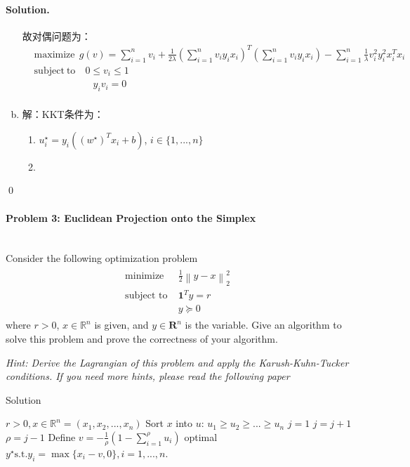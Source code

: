 \documentclass[a4paper]{article}
\newenvironment{solution}
{\color{blue} \paragraph{Solution.}}
{\newline \qed}
\begin{document}
\begin{solution}
\begin{enumerate}[a)]
                故对偶问题为：
                \begin{equation}
                    \begin{split}
                        &\text{maximize} \ \ g(v)=\sum_{i=1}^n v_i+\frac 1{2\lambda}(\sum_{i=1}^nv_iy_ix_i)^T(\sum_{i=1}^nv_iy_ix_i)-\sum_{i=1}^n \frac 1\lambda v_i^2y_i^2x_i^Tx_i\\
                        &\text{subject}\ \text{to}\quad 0\leq v_i\leq 1\\
                        &\quad \quad\quad\quad \quad\quad y_iv_i=0\\
                    \end{split}
                \end{equation}

        \item 解：KKT条件为：
            \begin{enumerate}[1)]
                \item $u^\star_i=y_i((w^\star)^Tx_i+b)$, $i\in\{1, ...,n\}$
                \item 
            \end{enumerate}
    \end{enumerate}
\end{solution}

\paragraph{Problem 3: Euclidean Projection onto the Simplex}
~\\
Consider the following optimization problem
\begin{gather*}
\begin{matrix}
\text{minimize~~} & \frac{1}{2}\left\|y-x\right\|^2_2\quad\\
\text{subject to} & \mathbf{1}^Ty=r\quad\quad\\
&y\succeq0\quad\quad\quad
\end{matrix}
\end{gather*}
where $r>0$, $x\in \mathbb{R}^n$ is given, and $y\in \mathbf{R}^n$ is the variable. Give an algorithm to solve this problem and prove the correctness of your algorithm.

\noindent\emph{Hint: Derive the Lagrangian of this problem and apply the Karush-Kuhn-Tucker conditions. If you need more hints, please read the following paper \cite{Wang2013}}


\begin{algorithm}
    \caption{Solution}
    \begin{algorithmic}[1]
        \REQUIRE $r>0,x\in \mathbb{R}^n=(x_1, x_2, ...,x_n)$
        \STATE Sort $x$ into $u$: $u_1\geq u_2\geq...\geq u_n$
        \STATE $j=1$
            \STATE $j=j+1$
        \ENDWHILE
        \STATE $\rho = j-1$
        \STATE Define $v=-\frac 1\rho (1-\sum_{i=1}^\rho u_i)$
        \ENSURE optimal $y^\star \text{s.t.} y_i=\max\{x_i-v ,0\}, i=1, ...,n$.
    \end{algorithmic}
\end{algorithm}
\end{document}
